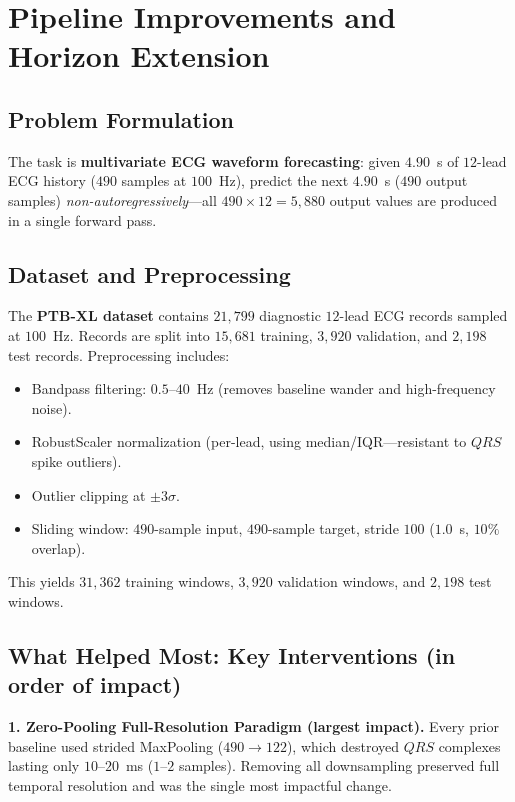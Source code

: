 \documentclass[10pt,journal,compsoc]{IEEEtran}
\begin{document}
\section{Pipeline Improvements and Horizon Extension}
\label{sec:pipeline}

\subsection{Problem Formulation}
The task is \textbf{multivariate ECG waveform forecasting}: given $4.90$~s of $12$-lead ECG history ($490$ samples at $100$~Hz), predict the next $4.90$~s ($490$ output samples) \textit{non-autoregressively}---all $490 \times 12 = 5{,}880$ output values are produced in a single forward pass.

\subsection{Dataset and Preprocessing}
The \textbf{PTB-XL dataset} contains $21{,}799$ diagnostic $12$-lead ECG records sampled at $100$~Hz. Records are split into $15{,}681$ training, $3{,}920$ validation, and $2{,}198$ test records. Preprocessing includes:
\begin{itemize}
    \item Bandpass filtering: $0.5$--$40$~Hz (removes baseline wander and high-frequency noise).
    \item RobustScaler normalization (per-lead, using median/IQR---resistant to $QRS$ spike outliers).
    \item Outlier clipping at $\pm 3\sigma$.
    \item Sliding window: $490$-sample input, $490$-sample target, stride $100$ ($1.0$~s, $10\%$ overlap).
\end{itemize}
This yields $31{,}362$ training windows, $3{,}920$ validation windows, and $2{,}198$ test windows.

\subsection{What Helped Most: Key Interventions (in order of impact)}

\textbf{1. Zero-Pooling Full-Resolution Paradigm (largest impact).}
Every prior baseline used strided MaxPooling ($490 \to 122$), which destroyed $QRS$ complexes lasting only $10$--$20$~ms ($1$--$2$ samples). Removing all downsampling preserved full temporal resolution and was the single most impactful change.
\end{document}
